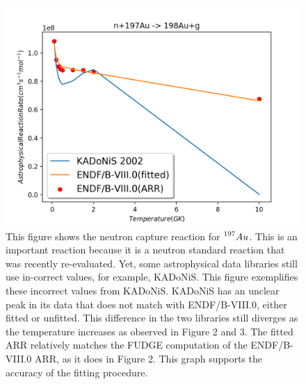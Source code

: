 \documentclass{article}
\begin{document}
\begin{figure}
\includegraphics[width=\linewidth]{Au.png}
  \caption{This figure shows the neutron capture reaction for $\prescript{197}{}{Au}$. This is an important reaction because it is a neutron standard reaction that was recently re-evaluated. Yet, some astrophysical data libraries still use in-correct values, for example, KADoNiS. This figure exemplifies these incorrect values from KADoNiS. KADoNiS has an unclear peak in its data that does not match with ENDF/B-VIII.0, either fitted or unfitted.\cite{kadonis} This difference in the two libraries still diverges as the temperature increases as observed in Figure 2 and 3. The fitted ARR relatively matches the FUDGE computation of the ENDF/B-VIII.0 ARR, as it does in Figure 2. This graph supports the accuracy of the fitting procedure. } \label{figure 4}
\end{figure}
\end{document}
